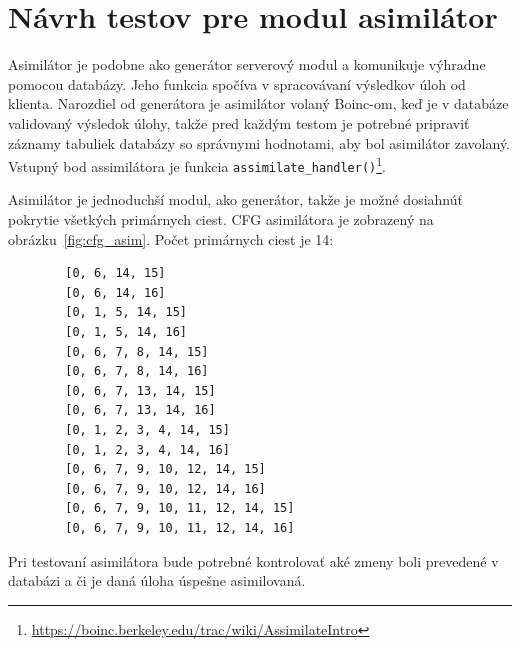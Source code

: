\section{Návrh testov pre modul asimilátor}
\label{navrh_asim}
Asimilátor je podobne ako generátor serverový modul a komunikuje výhradne pomocou databázy.
Jeho funkcia spočíva v spracovávaní výsledkov úloh od klienta.
Narozdiel od generátora je asimilátor volaný Boinc-om, keď je v databáze validovaný výsledok úlohy, takže pred každým testom je potrebné pripraviť záznamy tabuliek databázy so správnymi hodnotami, aby bol asimilátor zavolaný.
Vstupný bod assimilátora je funkcia \texttt{assimilate\_handler()}\footnote{\url{https://boinc.berkeley.edu/trac/wiki/AssimilateIntro}}.

Asimilátor je jednoduchší modul, ako generátor, takže je možné dosiahnúť pokrytie všetkých primárnych ciest.
CFG asimilátora je zobrazený na obrázku~\ref{fig:cfg_asim}.
Počet primárnych ciest je 14:
\begin{center}
	\begin{verbatim}
		[0, 6, 14, 15]
		[0, 6, 14, 16]
		[0, 1, 5, 14, 15]
		[0, 1, 5, 14, 16]
		[0, 6, 7, 8, 14, 15]
		[0, 6, 7, 8, 14, 16]
		[0, 6, 7, 13, 14, 15]
		[0, 6, 7, 13, 14, 16]
		[0, 1, 2, 3, 4, 14, 15]
		[0, 1, 2, 3, 4, 14, 16]
		[0, 6, 7, 9, 10, 12, 14, 15]
		[0, 6, 7, 9, 10, 12, 14, 16]
		[0, 6, 7, 9, 10, 11, 12, 14, 15]
		[0, 6, 7, 9, 10, 11, 12, 14, 16]
	\end{verbatim}
\end{center}

Pri testovaní asimilátora bude potrebné kontrolovať aké zmeny boli prevedené v databázi a či je daná úloha úspešne asimilovaná.

